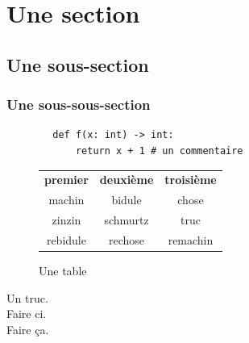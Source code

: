\documentclass{nsibook}
\begin{document}
\section{Une section}
\subsection{Une sous-section}
\subsubsection{Une sous-sous-section}
\lipsum[5]
\begin{pyc}
    \begin{verbatim}
        def f(x: int) -> int:
            return x + 1 # un commentaire
    \end{verbatim}
\end{pyc}
\lipsum[5]
\begin{figure}
    \begin{center}
        \begin{tabular}{ccc}
            \rowcolor{UGLiOrange!75}
            \color{white}\textbf{premier} & \color{white}\textbf{deuxième} & \color{white}\textbf{troisième} \\
            machin                        & bidule                         & chose                           \\
            zinzin                        & schmurtz                       & truc                            \\
            rebidule                      & rechose                        & remachin                        \\
        \end{tabular}
    \end{center}
    \caption{Une table}
\end{figure}

\begin{exercice}
    Un truc.\\
    \question Faire ci.\\
    \question Faire ça.\\
\end{exercice}
\end{document}
